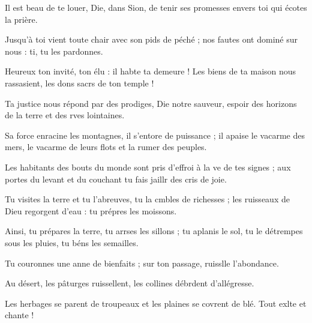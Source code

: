 \item Il est beau de te louer, Die, dans Sion,\psstar{} de tenir ses promesses envers toi qui écotes la prière.
\item Jusqu’à toi vient toute chair avec son pids de péché ;\psstar{} nos fautes ont dominé sur nous : ti, tu les pardonnes.
\item Heureux ton invité, ton élu : il habte ta demeure !\psstar{} Les biens de ta maison nous rassasient, les dons sacrs de ton temple !
\item Ta justice nous répond par des prodiges, Die notre sauveur,\psstar{} espoir des horizons de la terre et des rves lointaines.
\item Sa force enracine les montagnes, il s’entore de puissance ;\psstar{} il apaise le vacarme des mers, le vacarme de leurs flots et la rumer des peuples.
\item Les habitants des bouts du monde sont pris d’effroi à la ve de tes signes ;\psstar{} aux portes du levant et du couchant tu fais jaillr des cris de joie.
\item Tu visites la terre et tu l’abreuves, tu la cmbles de richesses ;\psstar{} les ruisseaux de Dieu regorgent d’eau : tu prépres les moissons. 
\item Ainsi, tu prépares la terre, tu arrses les sillons ;\psstar{} tu aplanis le sol, tu le détrempes sous les pluies, tu béns les semailles.
\item Tu couronnes une anne de bienfaits ;\psstar{} sur ton passage, ruisslle l’abondance.
\item Au désert, les pâturges ruissellent,\psstar{} les collines débrdent d’allégresse.
\item Les herbages se parent de troupeaux\pscross{} et les plaines se covrent de blé.\psstar{} Tout exlte et chante !
